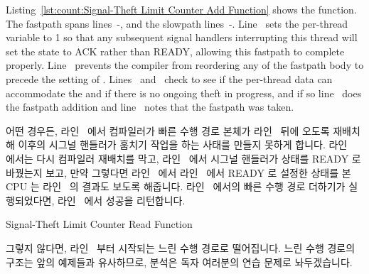 \begin{lineref}
\begin{lineref}
Listing~\ref{lst:count:Signal-Theft Limit Counter Add Function}
shows the  function.
The fastpath spans lines~-, and the slowpath
lines~-.
Line~ sets the per-thread  variable to 1 so that
any subsequent signal handlers interrupting this thread will
set the  state to ACK rather than READY, allowing this
fastpath to complete properly.
Line~ prevents the compiler from reordering any of the fastpath body
to precede the setting of .
Lines~ and~ check to see
if the per-thread data can accommodate
the  and if there is no ongoing theft in progress,
and if so line~ does the fastpath addition and
line~ notes that
the fastpath was taken.
\fi

어떤 경우든, 라인~ 에서 컴파일러가 빠른 수행 경로 본체가
라인~ 뒤에 오도록 재배치해 이후의 시그널 핸들러가 훔치기 작업을
하는 사태를 만들지 못하게 합니다.
라인~ 에서는 다시 컴파일러 재배치를 막고,
라인~ 에서 시그널 핸들러가  상태를 READY 로 바꿨는지
보고, 만약 그렇다면 라인~ 에서 라인~ 에서 READY 로
설정한 상태를 본 CPU 는 라인~ 의 결과도 보도록 해줍니다.
라인~ 에서의 빠른 수행 경로 더하기가 실행되었다면,
라인~ 에서 성공을 리턴합니다.

\end{lineref}

\begin{listing}[tbp]

\caption{Signal-Theft Limit Counter Read Function}
\label{lst:count:Signal-Theft Limit Counter Read Function}
\end{listing}

\begin{lineref}
그렇지 않다면, 라인~ 부터 시작되는 느린 수행 경로로 떨어집니다.
느린 수행 경로의 구조는 앞의 예제들과 유사하므로, 분석은 독자 여러분의 연습
문제로 놔두겠습니다.
\end{lineref}
\iffalse


\end{lineref}
